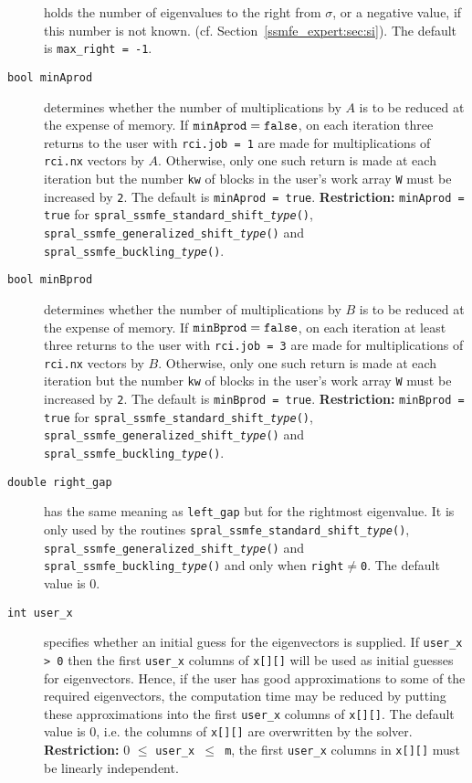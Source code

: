 \begin{description}
holds the number of eigenvalues to the right from $\sigma$,
or a negative value, if this number is not known.
(cf. Section~\ref{ssmfe_expert:sec:si}).
The default is {\tt max\_right = -1}.
%
\item[\texttt{bool minAprod}]
determines whether the number of multiplications by $A$ 
is to be reduced at the expense of memory. 
If ${\tt minAprod = false}$, 
on each iteration three returns to the user
with {\tt rci.job = 1} are
made for multiplications of {\tt rci.nx} vectors by $A$.
Otherwise,  only one such return is made at each iteration but 
the number {\tt kw} of blocks in the user's work array {\tt W} 
must be increased by {\tt 2}.
The default is {\tt minAprod~=~true}.
{\bf Restriction:} {\tt minAprod = true}
for {\tt spral\_ssmfe\_standard\_shift\_\textit{type}()},\\
{\tt spral\_ssmfe\_generalized\_shift\_\textit{type}()}
and  {\tt spral\_ssmfe\_buckling\_\textit{type}()}.
%
\item[\texttt{bool minBprod}]
determines whether the number of multiplications by $B$ 
is to be reduced at the expense of memory. 
If ${\tt minBprod = false}$, 
on each iteration at least three returns to the user
with {\tt rci.job = 3} are
made for multiplications of {\tt rci.nx} vectors by $B$.
Otherwise,  only one such return is made at each iteration but 
the number {\tt kw} of blocks in the user's work array {\tt W} 
must be increased by {\tt 2}.
The default is {\tt minBprod = true}.
{\bf Restriction:} {\tt minBprod = true}
for {\tt spral\_ssmfe\_standard\_shift\_\textit{type}()},\\
{\tt spral\_ssmfe\_generalized\_shift\_\textit{type}()}
and  {\tt spral\_ssmfe\_buckling\_\textit{type}()}.
%
\item[\texttt{double right\_gap}] has the same meaning as {\tt left\_gap} but for the rightmost eigenvalue. It is only used by the routines
{\tt spral\_ssmfe\_standard\_shift\_\textit{type}()}, {\tt spral\_ssmfe\_generalized\_shift\_\textit{type}()}
and {\tt spral\_ssmfe\_buckling\_\textit{type}()}
and only when {\tt right}$\ne${\tt 0}.
The default value is 0.
%
\item[\texttt{int user\_x}] specifies whether an initial guess for the eigenvectors is supplied.
If {\tt user\_x > 0} then the first {\tt user\_x} columns
of {\tt x[][]} will be used as initial guesses for eigenvectors.
Hence, if the user has good approximations
to some of the required eigenvectors, the computation time
may be reduced by putting these approximations
into the first {\tt user\_x} columns of {\tt x[][]}.
The default value is 0, 
i.e. the columns of {\tt x[][]} are overwritten by the solver.
{\bf Restriction:} {0 $\le$ \tt user\_x $\le$ m},
the first {\tt user\_x} columns in {\tt x[][]}
must be linearly independent.
%
\end{description}

